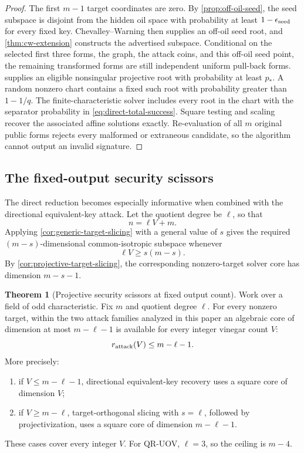 \documentclass[11pt,a4paper]{article}
\theoremstyle{definition}
\newtheorem{theorem}{Theorem}[section]
\theoremstyle{remark}
\begin{document}
\begin{proof}
The first $m-1$ target coordinates are zero.  By
\cref{prop:off-oil-seed}, the seed subspace is disjoint from the hidden oil
space with probability at least $1-\epsilon_{\rm seed}$ for every fixed key.
Chevalley--Warning then supplies an off-oil seed root, and
\cref{thm:cw-extension} constructs the advertised subspace.  Conditional on
the selected first three forms, the graph, the attack coins, and this off-oil
seed point, the remaining transformed forms are still independent uniform
pull-back forms.   supplies an eligible
nonsingular projective root with probability at least $p_*$.  A random nonzero
chart contains a fixed such root with probability greater than $1-1/q$.
The finite-characteristic solver includes every root in the chart with the
separator probability in \eqref{eq:direct-total-success}.  Square testing and
scaling recover the associated affine solutions exactly.  Re-evaluation of
all $m$ original public forms rejects every malformed or extraneous candidate,
so the algorithm cannot output an invalid signature.
\end{proof}

\subsection{The fixed-output security scissors}

The direct reduction becomes especially informative when combined with the
directional equivalent-key attack.  Let the quotient degree be $\ell$, so that
\[
 n=\ell V+m.
\]
Applying \cref{cor:generic-target-slicing} with a general value of $s$ gives
the required $(m-s)$-dimensional common-isotropic subspace whenever
\begin{equation}\label{eq:scissors-feasibility}
 \ell V\ge s(m-s).
\end{equation}
By \cref{cor:projective-target-slicing}, the corresponding nonzero-target
solver core has dimension $m-s-1$.

\begin{theorem}[Projective security scissors at fixed output count]\label{thm:security-scissors}
Work over a field of odd characteristic.  Fix $m$ and quotient degree $\ell$.  For every nonzero target, within the two
attack families analyzed in this paper an algebraic core of dimension at most
$m-\ell-1$ is available for every integer vinegar count $V$:
\begin{equation}\label{eq:scissors-bound}
 r_{\rm attack}(V)\le m-\ell-1.
\end{equation}
More precisely:
\begin{enumerate}
\item if $V\le m-\ell-1$, directional equivalent-key recovery uses a square
core of dimension $V$;
\item if $V\ge m-\ell$, target-orthogonal slicing with $s=\ell$, followed by
projectivization, uses a square core of dimension $m-\ell-1$.
\end{enumerate}
These cases cover every integer $V$.  For QR-UOV, $\ell=3$, so the ceiling is
$m-4$.
\end{theorem}
\end{document}
